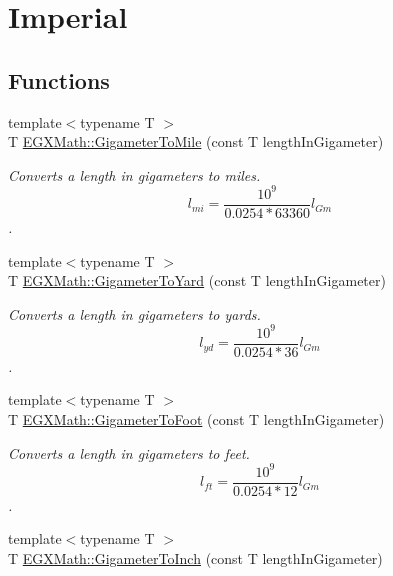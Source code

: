 \hypertarget{group___e_g_x_math-_conversions-_length_conversions-_s_i-_gigameter-_imperial}{}\section{Imperial}
\label{group___e_g_x_math-_conversions-_length_conversions-_s_i-_gigameter-_imperial}
\subsection*{Functions}
\begin{DoxyCompactItemize}
\item 
{\footnotesize template$<$typename T $>$ }\\T \mbox{\hyperlink{group___e_g_x_math-_conversions-_length_conversions-_s_i-_gigameter-_imperial_gab61b3324bc2080e5118924bffdd0d46d}{E\+G\+X\+Math\+::\+Gigameter\+To\+Mile}} (const T length\+In\+Gigameter)
\begin{DoxyCompactList}\small\item\em Converts a length in gigameters to miles. \[ l_{mi}=\frac{10^{9}}{0.0254 * 63360} l_{Gm} \]. \end{DoxyCompactList}\item 
{\footnotesize template$<$typename T $>$ }\\T \mbox{\hyperlink{group___e_g_x_math-_conversions-_length_conversions-_s_i-_gigameter-_imperial_gadc687ba83985120ec09d825adace01d6}{E\+G\+X\+Math\+::\+Gigameter\+To\+Yard}} (const T length\+In\+Gigameter)
\begin{DoxyCompactList}\small\item\em Converts a length in gigameters to yards. \[ l_{yd}= \frac{10^{9}}{0.0254 * 36} l_{Gm} \]. \end{DoxyCompactList}\item 
{\footnotesize template$<$typename T $>$ }\\T \mbox{\hyperlink{group___e_g_x_math-_conversions-_length_conversions-_s_i-_gigameter-_imperial_gaeabf3c29bcb3076a8b41986debbf046b}{E\+G\+X\+Math\+::\+Gigameter\+To\+Foot}} (const T length\+In\+Gigameter)
\begin{DoxyCompactList}\small\item\em Converts a length in gigameters to feet. \[ l_{ft}= \frac{10^{9}}{0.0254 * 12} l_{Gm} \]. \end{DoxyCompactList}\item 
{\footnotesize template$<$typename T $>$ }\\T \mbox{\hyperlink{group___e_g_x_math-_conversions-_length_conversions-_s_i-_gigameter-_imperial_gacff04b5343e94d6e31e601578d190fb8}{E\+G\+X\+Math\+::\+Gigameter\+To\+Inch}} (const T length\+In\+Gigameter)

\end{DoxyCompactItemize}

